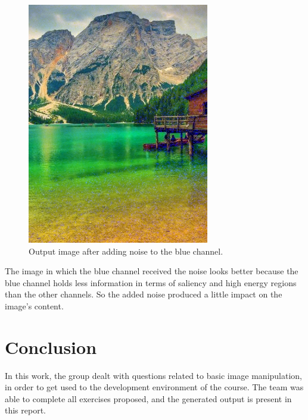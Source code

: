 \documentclass[]{IEEEtran}
\begin{document}
   \begin{figure}[!h]
    \centering
    \includegraphics[width=0.8\hsize]{../output/o-5-b-0.jpg}
    \caption{Output image after adding noise to the blue channel.}
    \label{fig:o-5-b-0}
  \end{figure}
  
  The image in which the blue channel received the noise looks better because the blue channel holds less information in terms of saliency and high energy regions than the other channels. So the added noise produced a little impact on the image's content.
  
  
  \section{Conclusion}
  
  In this work, the group dealt with questions related to basic image manipulation, in order to get used to the development environment of the course. The team was able to complete all exercises proposed, and the generated output is present in this report.
\end{document}
